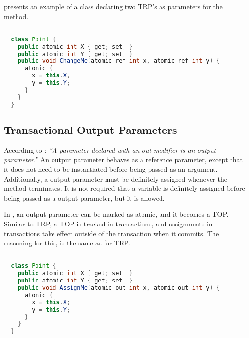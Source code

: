  presents an example of a  class declaring two \ac{TRP}'s as parameters for the  method.

\begin{lstlisting}[label=lst:atomic_ref,
  caption={Transactional Reference Parameter},
  language=Java,  
  showspaces=false,
  showtabs=false,
  breaklines=true,
  showstringspaces=false,
  breakatwhitespace=true,
  commentstyle=\color{greencomments},
  keywordstyle=\color{bluekeywords},
  stringstyle=\color{redstrings},
  morekeywords={atomic, retry, orElse, var, get, set}]  % Start your code-block

  class Point {
    public atomic int X { get; set; }
    public atomic int Y { get; set; }
    public void ChangeMe(atomic ref int x, atomic ref int y) {
      atomic { 
        x = this.X;
        y = this.Y;
      }
    }    
  }
\end{lstlisting}

\subsection{Transactional Output Parameters}
\label{subsec:stm_desgin_out_parameters}
According to \cite[p. 97]{csharp2013specificaiton}: \textit{``A parameter declared with an out modifier is an output parameter.''} An output parameter behaves as a reference parameter, except that it does not need to be instantiated before being passed as an argument. Additionally, a output parameter must be definitely assigned whenever the method terminates\cite[p. 42]{sestoft2011c}. It is not required that a variable is definitely assigned before being passed as a output parameter, but it is allowed.

In \stmname, an output parameter can be marked as atomic, and it becomes a \ac{TOP}. Similar to \ac{TRP}, a \ac{TOP} is tracked in transactions, and assignments in transactions take effect outside of the transaction when it commits. The reasoning for this, is the same as for \ac{TRP}.

\begin{lstlisting}[label=lst:atomic_out,
  caption={Transactional Output Parameter},
  language=Java,  
  showspaces=false,
  showtabs=false,
  breaklines=true,
  showstringspaces=false,
  breakatwhitespace=true,
  commentstyle=\color{greencomments},
  keywordstyle=\color{bluekeywords},
  stringstyle=\color{redstrings},
  morekeywords={atomic, retry, orElse, var, get, set}]  % Start your code-block

  class Point {
    public atomic int X { get; set; }
    public atomic int Y { get; set; }
    public void AssignMe(atomic out int x, atomic out int y) {
      atomic { 
        x = this.X;
        y = this.Y;
      }
    }    
  }
\end{lstlisting}

